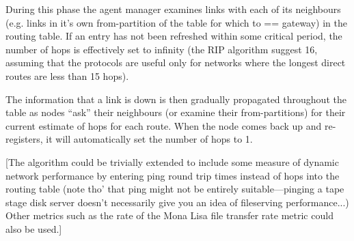\documentclass{cmspaper}
\begin{document}
During this phase the agent manager examines links with each of its
neighbours (e.g. links in it's own from-partition of the table for
which to == gateway) in the routing table.  If an entry has not been
refreshed within some critical period, the number of hops is
effectively set to infinity (the RIP algorithm suggest 16, assuming
that the protocols are useful only for networks where the longest
direct routes are less than 15 hops).

The information that a link is down is then gradually propagated
throughout the table as nodes ``ask'' their neighbours (or examine
their from-partitions) for their current estimate of hops for each
route.  When the node comes back up and re-registers, it will
automatically set the number of hops to 1.

[The algorithm could be trivially extended to include some measure of
dynamic network performance by entering ping round trip times instead
of hops into the routing table (note tho' that ping might not be
entirely suitable---pinging a tape stage disk server doesn't
necessarily give you an idea of fileserving performance...) Other
metrics such as the rate of the Mona Lisa file transfer rate metric
could also be used.]
\end{document}
